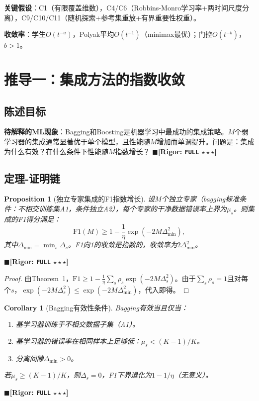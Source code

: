 \documentclass[12pt,a4paper]{ctexart}
\newtheorem{proposition}[theorem]{Proposition}
\newtheorem{corollary}[theorem]{Corollary}
\theoremstyle{definition}
\theoremstyle{remark}
\newcommand{\rigorFull}{$\blacksquare$\;\textbf{[Rigor: \texttt{FULL} $\star\star\star$]}}
\begin{document}
\noindent\textbf{关键假设}：C1（有限覆盖维数），C4/C6（Robbins-Monro学习率+两时间尺度分离），C9/C10/C11（随机探索+参考集重放+有界重要性权重）。

\noindent\textbf{收敛率}：学生$O(t^{-a})$，Polyak平均$O(t^{-1})$（minimax最优）；门控$O(t^{-b})$，$b > 1$。

\section{推导一：集成方法的指数收敛}
\label{sec:ensemble}

\subsection{陈述目标}
\textbf{待解释的ML现象}：Bagging和Boosting是机器学习中最成功的集成策略。$M$个弱学习器的集成通常显著优于单个模型，且性能随$M$增加而单调提升。问题是：集成为什么有效？在什么条件下性能随$M$指数增长？
\rigorFull

\subsection{定理-证明链}

\begin{proposition}[独立专家集成的F1指数增长]
\label{prop:1}
设$M$个独立专家（bagging标准条件：不相交训练集A1，条件独立A2），每个专家的干净数据错误率上界为$\mu_s$。则集成的F1得分满足：
\begin{equation}
\mathrm{F1}(M) \geq 1 - \frac{1}{\eta}\exp(-2M\Delta_{\min}^2),
\end{equation}
其中$\Delta_{\min} = \min_s \Delta_s$。F1向1的收敛是指数的，收敛率为$2\Delta_{\min}^2$。
\end{proposition}
\rigorFull

\begin{proof}
由Theorem~1，$\mathrm{F1} \geq 1 - \frac{1}{\eta}\sum_s \rho_s \exp(-2M\Delta_s^2)$。由于$\sum_s \rho_s = 1$且对每个$s$，$\exp(-2M\Delta_s^2) \leq \exp(-2M\Delta_{\min}^2)$，代入即得。
\end{proof}

\begin{corollary}[Bagging有效性条件]
\label{cor:1}
Bagging有效当且仅当：
\begin{enumerate}[label=\arabic*.]
\item 基学习器训练于不相交数据子集（A1）。
\item 基学习器的错误率在相同样本上足够低：$\mu_s < (K-1)/K$。
\item 分离间隙$\Delta_{\min} > 0$。
\end{enumerate}
若$\mu_s \geq (K-1)/K$，则$\Delta_s = 0$，F1下界退化为$1 - 1/\eta$（无意义）。
\end{corollary}
\rigorFull
\end{document}
